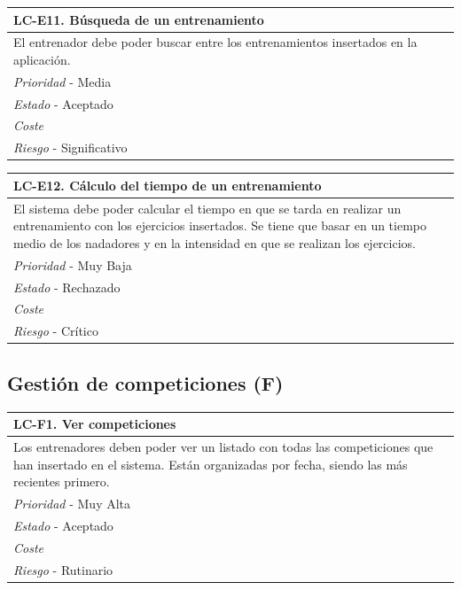 	\begin{center}
		\begin{tabularx}{15cm}{|X|}
			\hline 
				\bf{LC-E11. Búsqueda de un entrenamiento}\\
			\hline
				El entrenador debe poder buscar entre los entrenamientos insertados en la aplicación.\\
			\hline
				{\it Prioridad} - Media\\
			\hline
				{\it Estado} - Aceptado\\
			\hline
				{\it Coste}\\
			\hline
				{\it Riesgo} - Significativo\\
			\hline
		\end{tabularx}
	\end{center}
	
	\begin{center}
		\begin{tabularx}{15cm}{|X|}
			\hline 
				\bf{LC-E12. Cálculo del tiempo de un entrenamiento}\\
			\hline
				El sistema debe poder calcular el tiempo en que se tarda en realizar un entrenamiento con los ejercicios insertados. Se tiene que basar en un tiempo medio de los nadadores y en la intensidad en que se realizan los ejercicios.\\
			\hline
				{\it Prioridad} - Muy Baja\\
			\hline
				{\it Estado} - Rechazado\\
			\hline
				{\it Coste}\\
			\hline
				{\it Riesgo} - Crítico\\
			\hline
		\end{tabularx}
	\end{center}

%
%
\subsection{Gestión de competiciones (F)} %
	\label{sub:gestion_de_competiciones}

	\begin{center}
		\begin{tabularx}{15cm}{|X|}
			\hline 
				\bf{LC-F1. Ver competiciones}\\
			\hline
				Los entrenadores deben poder ver un listado con todas las competiciones que han insertado en el sistema. Están organizadas por fecha, siendo las más recientes primero.\\
			\hline
				{\it Prioridad} - Muy Alta\\
			\hline
				{\it Estado} - Aceptado\\
			\hline
				{\it Coste}\\
			\hline
				{\it Riesgo} - Rutinario\\
			\hline
		\end{tabularx}
	\end{center}
	
